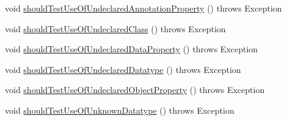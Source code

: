 \begin{DoxyCompactItemize}
\item 
void \hyperlink{classorg_1_1semanticweb_1_1owlapi_1_1contract_1_1_contract_owlapi_profiles_test_ab68080e5a5ce2436e95c77c31516d9f1}{should\-Test\-Use\-Of\-Undeclared\-Annotation\-Property} ()  throws Exception 
\item 
void \hyperlink{classorg_1_1semanticweb_1_1owlapi_1_1contract_1_1_contract_owlapi_profiles_test_acd227e8a61cd5cc60fc1b0e5145d7cd0}{should\-Test\-Use\-Of\-Undeclared\-Class} ()  throws Exception 
\item 
void \hyperlink{classorg_1_1semanticweb_1_1owlapi_1_1contract_1_1_contract_owlapi_profiles_test_a46a349bdcaa5bd48ebd44a2a060cec60}{should\-Test\-Use\-Of\-Undeclared\-Data\-Property} ()  throws Exception 
\item 
void \hyperlink{classorg_1_1semanticweb_1_1owlapi_1_1contract_1_1_contract_owlapi_profiles_test_a5782aac22bae4474d678d2b4882ed790}{should\-Test\-Use\-Of\-Undeclared\-Datatype} ()  throws Exception 
\item 
void \hyperlink{classorg_1_1semanticweb_1_1owlapi_1_1contract_1_1_contract_owlapi_profiles_test_a4eb6cb5f1a3fc75f46c119acdb7d1fba}{should\-Test\-Use\-Of\-Undeclared\-Object\-Property} ()  throws Exception 
\item 
void \hyperlink{classorg_1_1semanticweb_1_1owlapi_1_1contract_1_1_contract_owlapi_profiles_test_ac07b6dadb6e2c7169c98fd815fdbebb7}{should\-Test\-Use\-Of\-Unknown\-Datatype} ()  throws Exception 
\end{DoxyCompactItemize}


